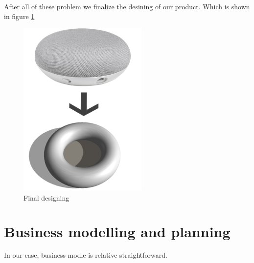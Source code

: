\documentclass[12pt,twoside]{article}
\begin{document}
After all of these problem we finalize the desining of our product. Which is shown in figure \ref{fig:Final designing}

\begin{figure}[!htb]
\centering
\includegraphics[height=0.6\textwidth]{safedock.png}
\caption{Final designing}
\label{fig:Final designing}
\end{figure}






\section{Business modelling and planning}
\label{sec:Business modelling and planning}
In our case, business modle is relative straightforward. 
\end{document}
